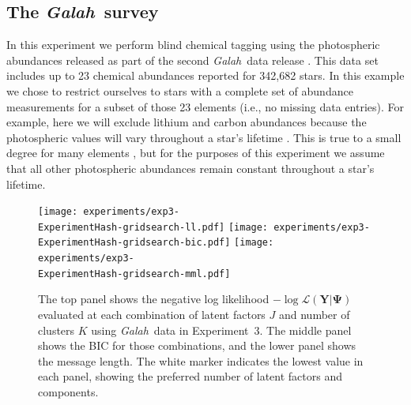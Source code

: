 \documentclass[twocolumn]{aastex62}
\newcommand{\project}[1]{\textsl{#1}}
\newcommand{\Galah}{\project{Galah}}
\newcommand{\vect}[1]{\boldsymbol{\mathbf{#1}}}
\renewcommand{\vec}[1]{\vect{#1}}
\newcommand{\data}{\textbf{Y}}
\newcommand{\NumLatentFactors}{J}
\newcommand{\NumComponents}{K}
\newcommand{\ExperimentHash}{89dab}
\begin{document}
\subsection{The \Galah\ survey}
\label{sec:exp4}

In this experiment we perform blind chemical tagging using the 
photospheric abundances released as part of the second \Galah\ 
data release \citep{Buder:2018}. This data set includes
up to 23 chemical abundances reported for 342,682 stars.
In this example we chose to restrict ourselves to stars with a
complete set of abundance measurements for a subset of those 23 elements
(i.e., no missing data entries).
For example, here we will exclude
lithium and carbon abundances because the
photospheric values will vary throughout a star's lifetime \citep[e.g.,][]{Casey:2016b,Casey:2019}. This is true
to a small degree for many elements \citep[e.g.,][]{Dotter:2017},
but for the purposes of this experiment we assume that all other
photospheric abundances remain constant throughout a star's
lifetime.




\begin{figure}
	\texttt{[image: experiments/exp3-\\ExperimentHash-gridsearch-ll.pdf]}
	\texttt{[image: experiments/exp3-\\ExperimentHash-gridsearch-bic.pdf]}
	\texttt{[image: experiments/exp3-\\ExperimentHash-gridsearch-mml.pdf]}
    \caption{The top panel shows the negative log likelihood 
			 $-\log{\mathcal{L}\left(\data|\vec\Psi\right)}$ 
			 evaluated at each combination of latent factors 
			 $\NumLatentFactors$ and number of clusters 
			 $\NumComponents$ using \Galah\ data in
			 Experiment~3.  The middle panel shows 
			 the BIC for those combinations, and the lower panel shows the 
			 message length. The white marker indicates the
			 lowest value in each panel, showing the
			 preferred number of latent factors and components.}
    \label{fig:exp3-gridsearch}
\end{figure}
\end{document}
